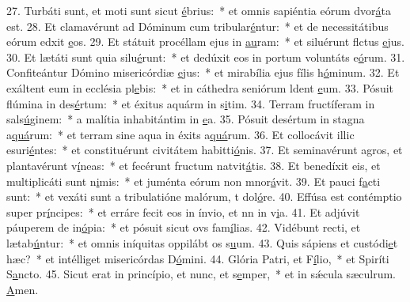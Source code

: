 27. Turbáti sunt, et moti sunt sicut \uline{é}brius:~* et omnis sapiéntia eórum dvor\uline{á}ta est.
28. Et clamavérunt ad Dóminum cum tribular\uline{é}ntur:~* et de necessitátibus eórum edxit \uline{e}os.
29. Et státuit procéllam ejus in \uline{au}ram:~* et siluérunt flctus \uline{e}jus.
30. Et lætáti sunt quia silu\uline{é}runt:~* et dedúxit eos in portum voluntáts e\uline{ó}rum.
31. Confiteántur Dómino misericórdiæ \uline{e}jus:~* et mirabília ejus fílis h\uline{ó}minum.
32. Et exáltent eum in ecclésia pl\uline{e}bis:~* et in cáthedra seniórum ldent \uline{e}um.
33. Pósuit flúmina in des\uline{é}rtum:~* et éxitus aquárm in s\uline{i}tim.
34. Terram fructíferam in sals\uline{ú}ginem:~* a malítia inhabitántim in \uline{e}a.
35. Pósuit desértum in stagna a\uline{quá}rum:~* et terram sine aqua in éxits a\uline{quá}rum.
36. Et collocávit illic esuri\uline{é}ntes:~* et constituérunt civitátem habitti\uline{ó}nis.
37. Et seminavérunt agros, et plantavérunt v\uline{í}neas:~* et fecérunt fructum natvit\uline{á}tis.
38. Et benedíxit eis, et multiplicáti sunt n\uline{i}mis:~* et juménta eórum non mnor\uline{á}vit.
39. Et pauci f\uline{a}cti sunt:~* et vexáti sunt a tribulatióne malórum, t dol\uline{ó}re.
40. Effúsa est contémptio super pr\uline{í}ncipes:~* et erráre fecit eos in ínvio, et nn in v\uline{i}a.
41. Et adjúvit páuperem de in\uline{ó}pia:~* et pósuit sicut ovs fam\uline{í}lias.
42. Vidébunt recti, et lætab\uline{ú}ntur:~* et omnis iníquitas oppilábt os s\uline{u}um.
43. Quis sápiens et custódi\uline{e}t hæc?~* et intélliget misericórdas D\uline{ó}mini.
44. Glória Patri, et F\uline{í}lio,~* et Spiríti S\uline{a}ncto.
45. Sicut erat in princípio, et nunc, et s\uline{e}mper,~* et in sǽcula sæculrum. \uline{A}men.
